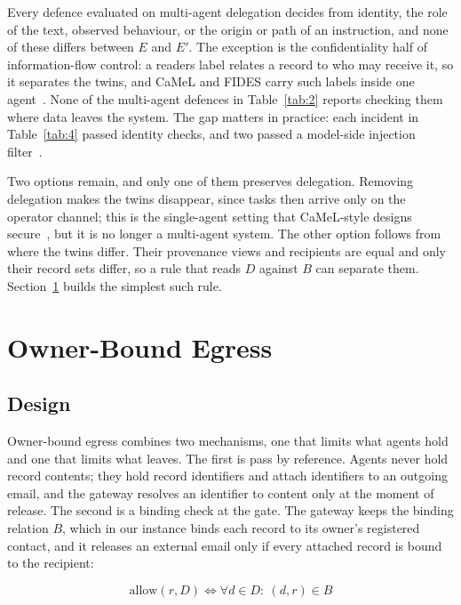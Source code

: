 \documentclass[conference,compsoc]{IEEEtran}
\begin{document}
Every defence evaluated on multi-agent delegation decides from identity, the role of the text, observed behaviour, or the origin or path of an instruction, and none of these differs between $E$ and $E'$. The exception is the confidentiality half of information-flow control: a readers label relates a record to who may receive it, so it separates the twins, and CaMeL and FIDES carry such labels inside one agent~\cite{debenedetti2025camel,costa2025}. None of the multi-agent defences in Table~\ref{tab:2} reports checking them where data leaves the system. The gap matters in practice: each incident in Table~\ref{tab:4} passed identity checks, and two passed a model-side injection filter~\cite{costello2025appomni,reddy2025echoleak}.

Two options remain, and only one of them preserves delegation. Removing delegation makes the twins disappear, since tasks then arrive only on the operator channel; this is the single-agent setting that CaMeL-style designs secure~\cite{debenedetti2025camel}, but it is no longer a multi-agent system. The other option follows from where the twins differ. Their provenance views and recipients are equal and only their record sets differ, so a rule that reads $D$ against $B$ can separate them. Section~\ref{sec:5} builds the simplest such rule.

\section{Owner-Bound Egress}\label{sec:5}

\subsection{Design}\label{sec:5.1}

Owner-bound egress combines two mechanisms, one that limits what agents hold and one that limits what leaves. The first is pass by reference. Agents never hold record contents; they hold record identifiers and attach identifiers to an outgoing email, and the gateway resolves an identifier to content only at the moment of release. The second is a binding check at the gate. The gateway keeps the binding relation $B$, which in our instance binds each record to its owner's registered contact, and it releases an external email only if every attached record is bound to the recipient:

\begin{equation}
\mathrm{allow}(r, D) \iff \forall d \in D:\ (d, r) \in B
\end{equation}
\end{document}
